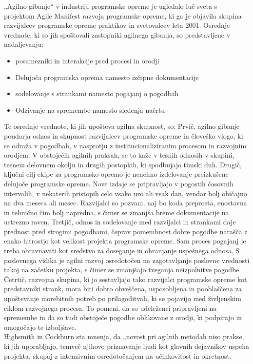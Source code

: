 \documentclass[a4paper,12pt,openright]{book}
\begin{document}
„Agilno gibanje“ v industriji programske opreme je ugledalo luč sveta s projektom Agile Manifest razvoja programske opreme, ki ga je objavila skupina razvijalcev programske opreme praktikov in svetovalcev leta 2001. Osrednje vrednote, ki so jih spoštovali zastopniki agilnega gibanja, so predstavljene v nadaljevanju:
\begin{itemize}
    \item posamezniki in interakcije pred procesi in orodji
    \item Delujoča programska oprema namesto izčrpne dokumentacije
    \item sodelovanje s strankami namesto pogajanj o pogodbah
    \item Odzivanje na spremembe namesto sledenja načrtu
\end{itemize}
\cite{highsmith2009agile}
Te osrednje vrednote, ki jih upošteva agilna skupnost, so:
Prvič, agilno gibanje poudarja odnos in skupnost
razvijalcev programske opreme in človeško vlogo, ki se odraža v pogodbah, v nasprotju z institucionaliziranim procesom in razvojnim orodjem. V obstoječih agilnih praksah, se to kaže v tesnih odnosih v skupini, tesnem delovnem okolju
in drugih postopkih, ki spodbujajo timski duh.
Drugič, ključni cilj ekipe za programsko opremo je nenehno izdelovanje preizkušene delujoče programske opreme. Nove izdaje se pripravljajo v pogostih časovnih intervalih, v nekaterih pristopih celo vsako uro ali vsak dan, vendar bolj običajno na dva meseca ali mesec. 
Razvijalci so pozvani, naj bo koda preprosta, enostavna in tehnično
čim bolj napredna, s čimer se zmanjša breme dokumentacije na ustrezno raven.
Tretjič, odnos in sodelovanje med razvijalci in strankami daje prednost pred strogimi pogodbami, čeprav pomembnost dobre pogodbe narašča z enako hitrostjo kot velikost projekta programske opreme.
Sam proces pogajanj je treba obravnavati kot sredstvo za doseganje in
ohranjanje uspešnega odnosa. S poslovnega vidika je agilni razvoj osredotočen na zagotavljanje poslovne vrednosti takoj na začetku projekta, s čimer se zmanjšajo tveganja neizpolnitve pogodbe.
Četrtič, razvojna skupina, ki jo sestavljajo tako razvijalci programske opreme kot predstavniki strank, mora biti dobro obveščena, usposobljena in pooblaščena za upoštevanje morebitnih potreb po prilagoditvah, ki se pojavijo med življenskim ciklom razvojnega procesa. To pomeni, da so udeleženci pripravljeni na spremembe in da so tudi obstoječe pogodbe oblikovane z orodji, ki podpirajo in omogočajo te
izboljšave. \\
Highsmith in Cockburn sta mnenja, da „novost pri agilnih metodah niso prakse, ki jih uporabljajo, temveč njihovo priznavanje ljudi kot glavnih dejavnikov uspeha projekta, skupaj z intenzivnim osredotočanjem na učinkovitost in okretnost. 
\cite{DBLP:journals/corr/abs-1709-08439}
\end{document}
